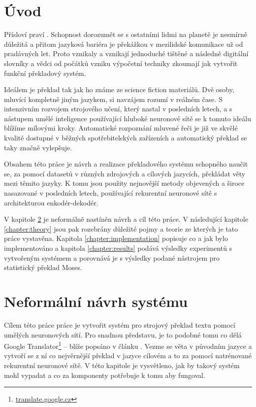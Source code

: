 \chapter{Úvod}
Přísloví praví . Schopnost dorozumět se s ostatními lidmi na planetě je nesmírně důležitá a přitom jazyková bariéra je překážkou v mezilidské komunikace už od pradávných let. Proto vznikaly a vznikají jednoduché tištěné a následně digitální slovníky a vědci od počátků vzniku výpočetní techniky zkoumají jak vytvořit funkční překladový systém.

Ideálem je překlad tak jak ho známe ze science fiction materiálů. Dvě osoby, mluvící kompletně jiným jazykem, si navzájem rozumí v reálném čase. S intenzivním rozvojem strojového učení, který nastal v posledních letech, a s nástupem umělé inteligence používající hluboké neuronové sítě se k tomuto ideálu blížíme mílovými kroky. Automatické rozpoznání mluvené řeči je již ve skvělé kvalitě dostupné v běžných spotřebitelských zařízeních a automatický překlad se taky značně vylepšuje.

Obsahem této práce je návrh a realizace překladového systému schopného naučit se, za pomocí datasetů v různých zdrojových a cílových jazycích, překládat věty mezi těmito jazyky. K tomu jsou použity nejnovější metody objevených a široce nasazované v posledních letech, používající rekurentní neuronové sítě s architekturou enkodér-dekodér.

V kapitole \ref{chapter:draft} je neformálně nastíněn návrh a cíl této práce. V následující kapitole \ref{chapter:theory} jsou pak rozebrány důležité pojmy a teorie ze kterých je tato práce vystavěna. Kapitola \ref{chapter:implementation} popisuje co a jak bylo implementováno a kapitola \ref{chapter:results} podává výsledky experimentů s vytvořeným systémem a porovnává je s výsledky podané nástrojem pro statistický překlad Moses.

\chapter{Neformální návrh systému} \label{chapter:draft}
Cílem této práce práce je vytvořit systém pro strojový překlad textu pomocí umělých neuronových sítí. Pro snadnou představu, je to podobné tomu co dělá Google Translator\footnote{\url{translate.google.cz}} -- blíže popsáno v článku \cite{googleBridgingGap}. Vezme se věta v původním jazyce a vytvoří se z ní co nejvěrnější překlad v jazyce cílovém a to za pomocí natrénované rekurentní neuronové sítě. V této kapitole je vysvětleno, jak by takový systém mohl vypadat a co za komponenty potřebuje k tomu aby fungoval.

